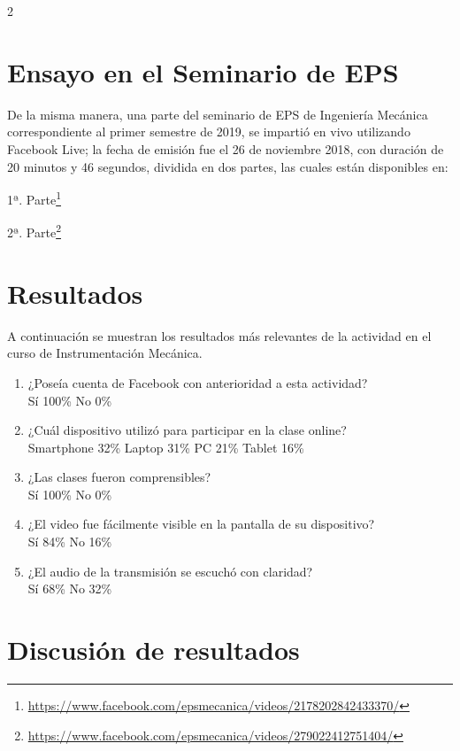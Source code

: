 \documentclass[11pt,spanish,Letterpaper,openany]{book}
\let\rmarkdownfootnote\footnote%
\def\footnote{\protect\rmarkdownfootnote}
\begin{document}
\begin {multicols}{2}

\hypertarget{ensayo-en-el-seminario-de-eps}{%
\section{Ensayo en el Seminario de EPS}\label{ensayo-en-el-seminario-de-eps}}

De la misma manera, una parte del seminario de EPS de Ingeniería Mecánica correspondiente al primer semestre de 2019, se impartió en vivo utilizando Facebook Live; la fecha de emisión fue el 26 de noviembre 2018, con duración de 20 minutos y 46 segundos, dividida en dos partes, las cuales están disponibles en:

1ª. Parte\footnote{\url{https://www.facebook.com/epsmecanica/videos/2178202842433370/}}

2ª. Parte\footnote{\url{https://www.facebook.com/epsmecanica/videos/279022412751404/}}

\hypertarget{resultados}{%
\section{Resultados}\label{resultados}}

A continuación se muestran los resultados más relevantes de la actividad en el curso de Instrumentación Mecánica.

\begin{enumerate}
\def\labelenumi{\alph{enumi}.}
\item
  ¿Poseía cuenta de Facebook con anterioridad a esta actividad?\\
  Sí 100\% No 0\%
\item
  ¿Cuál dispositivo utilizó para participar en la clase online?\\
  Smartphone 32\% Laptop 31\% PC 21\% Tablet 16\%
\item
  ¿Las clases fueron comprensibles?\\
  Sí 100\% No 0\%
\item
  ¿El video fue fácilmente visible en la pantalla de su dispositivo?\\
  Sí 84\% No 16\%
\item
  ¿El audio de la transmisión se escuchó con claridad?\\
  Sí 68\% No 32\%
\end{enumerate}

\hypertarget{discusion-de-resultados}{%
\section{Discusión de resultados}\label{discusion-de-resultados}}


\end{multicols}
\end{document}
